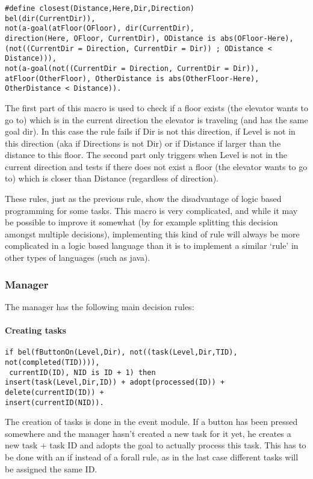 \documentclass[a4paper,11pt]{article}
\begin{document}
\begin{verbatim}
#define closest(Distance,Here,Dir,Direction)
bel(dir(CurrentDir)), 
not(a-goal(atFloor(OFloor), dir(CurrentDir), 
direction(Here, OFloor, CurrentDir), ODistance is abs(OFloor-Here),
(not((CurrentDir = Direction, CurrentDir = Dir)) ; ODistance < Distance))),
not(a-goal(not((CurrentDir = Direction, CurrentDir = Dir)), 
atFloor(OtherFloor), OtherDistance is abs(OtherFloor-Here), OtherDistance < Distance)).
\end{verbatim}

The first part of this macro is used to check if a floor exists (the elevator wants to go to) which is in the current direction the elevator is traveling (and has the same goal dir). In this case the rule fails if Dir is not this direction, if Level is not in this direction (aka if Directions is not Dir) or if Distance if larger than the distance to this floor. The second part only triggers when Level is not in the current direction and tests if there does not exist a floor (the elevator wants to go to) which is closer than Distance (regardless of direction).

These rules, just as the previous rule, show the disadvantage of logic based programming for some tasks. This macro is very complicated, and while it may be possible to improve it somewhat (by for example splitting this decision amongst multiple decisions), implementing this kind of rule will always be more complicated in a logic based language than it is to implement a similar `rule' in other types of languages (such as java).

\subsubsection{Manager}
The manager has the following main decision rules:

\paragraph*{Creating tasks}
\begin{verbatim}
if bel(fButtonOn(Level,Dir), not((task(Level,Dir,TID), not(completed(TID)))),
 currentID(ID), NID is ID + 1) then
insert(task(Level,Dir,ID)) + adopt(processed(ID)) + delete(currentID(ID)) + 
insert(currentID(NID)).
\end{verbatim}

The creation of tasks is done in the event module. If a button has been pressed somewhere and the manager hasn't created a new task for it yet, he creates a new task + task ID and adopts the goal to actually process this task. This has to be done with an if instead of a forall rule, as in the last case different tasks will be assigned the same ID.
\end{document}
